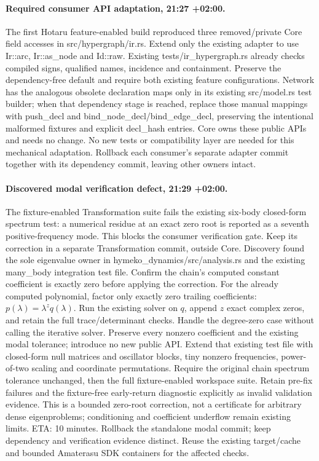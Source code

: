 \documentclass[11pt,a4paper]{article}
\begin{document}
\paragraph{Required consumer API adaptation, 21:27 +02:00.}
The first Hotaru feature-enabled build reproduced three removed/private Core
field accesses in src/hypergraph/ir.rs. Extend only the existing adapter to use
Ir::arc, Ir::as\_node and Id::raw. Existing tests/ir\_hypergraph.rs already checks
compiled signs, qualified names, incidence and containment. Preserve the
dependency-free default and require both existing feature configurations.
Network has the analogous obsolete declaration maps only in its existing
src/model.rs test builder; when that dependency stage is reached, replace those
manual mappings with push\_decl and bind\_node\_decl/bind\_edge\_decl, preserving
the intentional malformed fixtures and explicit decl\_hash entries. Core owns
these public APIs and needs no change. No new tests or compatibility layer are
needed for this mechanical adaptation. Rollback each consumer's separate
adapter commit together with its dependency commit, leaving other owners intact.
\paragraph{Discovered modal verification defect, 21:29 +02:00.}
The fixture-enabled Transformation suite fails the existing six-body closed-form
spectrum test: a numerical residue at an exact zero root is reported as a
seventh positive-frequency mode. This blocks the consumer verification gate.
Keep its correction in a separate Transformation commit, outside Core. Discovery
found the sole eigenvalue owner in hymeko\_dynamics/src/analysis.rs and the existing
many\_body integration test file. Confirm the chain's computed constant
coefficient is exactly zero before applying the correction. For the already
computed polynomial, factor only exactly zero trailing coefficients:
$p(\lambda)=\lambda^z q(\lambda)$. Run the existing solver on $q$, append $z$
exact complex zeros, and retain the full trace/determinant checks. Handle the
degree-zero case without calling the iterative solver. Preserve every nonzero
coefficient and the existing modal tolerance; introduce no new public API.
Extend that existing test file with closed-form null matrices and oscillator
blocks, tiny nonzero frequencies, power-of-two scaling and coordinate
permutations. Require the original chain spectrum tolerance unchanged, then
the full fixture-enabled workspace suite. Retain pre-fix failures and the
fixture-free early-return diagnostic explicitly as invalid validation evidence.
This is a bounded zero-root correction, not a certificate for arbitrary dense
eigenproblems; conditioning and coefficient underflow remain existing limits.
ETA: 10 minutes. Rollback the standalone modal commit; keep dependency and
verification evidence distinct. Reuse the existing target/cache and bounded
Amaterasu SDK containers for the affected checks.
\end{document}

